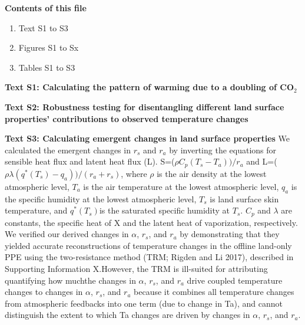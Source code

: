 \documentclass[draft,grl]{agutexSI2019}
\begin{document}
\begin{article}

\noindent\textbf{Contents of this file}
\begin{enumerate}
\item Text S1 to S3
\item Figures S1 to Sx
\item Tables S1 to S3
\end{enumerate}


\noindent\textbf{Text S1: Calculating the pattern of warming due to a doubling of CO$_2$}

\noindent\textbf{Text S2: Robustness testing for disentangling different land surface properties’ contributions to observed temperature changes}

\noindent\textbf{Text S3: Calculating emergent changes in land surface properties}
We calculated the emergent changes in $r_s$ and $r_a$ by inverting the equations for sensible heat flux and latent heat flux (L).  S=($\rho C_p (T_s-T_a))/r_a$  and L=($\rho \lambda(q^* (T_s)-q_a))/(r_a+r_s )$, where $\rho$ is the air density at the lowest atmospheric level, $T_a$ is the air temperature at the lowest atmospheric level, $q_a$ is the specific humidity at the lowest atmospheric level, $T_s$ is land surface skin temperature, and $q^* (T_s)$is the saturated specific humidity at $T_s$. $C_p$ and $\lambda$ are constants, the specific heat of X and the latent heat of vaporization, respectively. We verified our derived changes in $\alpha$, $r_s$, and $r_a$ by demonstrating that they yielded accurate reconstructions of temperature changes in the offline land-only PPE using the two-resistance method (TRM; Rigden and Li 2017), described in Supporting Information X.However, the TRM is ill-suited for attributing quantifying how muchthe  changes in $\alpha$, $r_s$, and $r_a$ drive coupled temperature changes to changes in $\alpha$, $r_s$, and $r_a$ because it combines all temperature changes from atmospheric feedbacks into one term (due to change in Ta), and cannot distinguish the extent to which Ta changes are driven by changes in $\alpha$, $r_s$, and $r_a$.
%
% 
\end{article}
\end{document}
